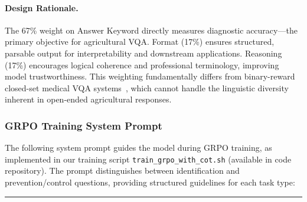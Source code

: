 \documentclass[11pt]{article}
\begin{document}
\paragraph{Design Rationale.}

The 67\% weight on Answer Keyword directly measures diagnostic accuracy—the primary objective for agricultural VQA. Format (17\%) ensures structured, parsable output for interpretability and downstream applications. Reasoning (17\%) encourages logical coherence and professional terminology, improving model trustworthiness. This weighting fundamentally differs from binary-reward closed-set medical VQA systems~\cite{lai2025med,pan2025medvlm}, which cannot handle the linguistic diversity inherent in open-ended agricultural responses.

\subsubsection{GRPO Training System Prompt}

\noindent The following system prompt guides the model during GRPO training, as implemented in our training script \texttt{train\_grpo\_with\_cot.sh} (available in code repository). The prompt distinguishes between identification and prevention/control questions, providing structured guidelines for each task type:

\vspace{4pt}
\noindent\rule{\columnwidth}{0.4pt}
\vspace{3pt}
\end{document}
